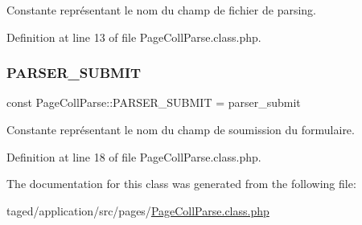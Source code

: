 Constante représentant le nom du champ de fichier de parsing. 

Definition at line 13 of file Page\+Coll\+Parse.\+class.\+php.

\mbox{\label{class_page_coll_parse_a40bfd3341471b7fd8ae6a910b4a24bf5}} 
\subsubsection{\texorpdfstring{P\+A\+R\+S\+E\+R\+\_\+\+S\+U\+B\+M\+IT}{PARSER\_SUBMIT}}
{\footnotesize\ttfamily const Page\+Coll\+Parse\+::\+P\+A\+R\+S\+E\+R\+\_\+\+S\+U\+B\+M\+IT = \textquotesingle{}parser\+\_\+submit\textquotesingle{}}

Constante représentant le nom du champ de soumission du formulaire. 

Definition at line 18 of file Page\+Coll\+Parse.\+class.\+php.



The documentation for this class was generated from the following file\+:\begin{DoxyCompactItemize}
\item 
taged/application/src/pages/\hyperlink{_page_coll_parse_8class_8php}{Page\+Coll\+Parse.\+class.\+php}\end{DoxyCompactItemize}
